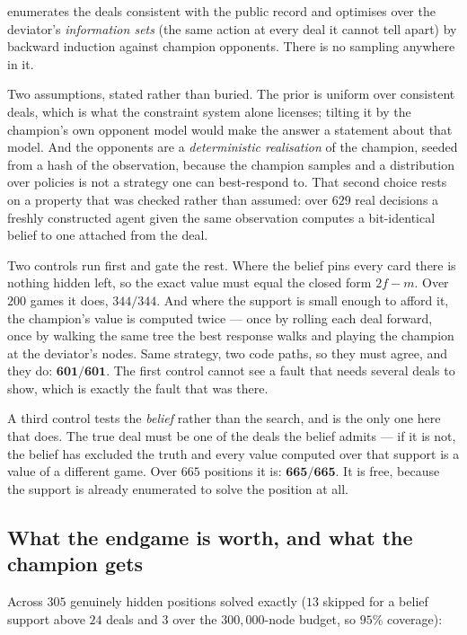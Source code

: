 \documentclass[11pt,letterpaper]{article}
\begin{document}
 enumerates the deals consistent with the public record
and optimises over the deviator's \emph{information sets} (the same action
at every deal it cannot tell apart) by backward induction against champion
opponents. There is no sampling anywhere in it.

Two assumptions, stated rather than buried. The prior is uniform over
consistent deals, which is what the constraint system alone licenses; tilting
it by the champion's own opponent model would make the answer a statement about
that model. And the opponents are a \emph{deterministic realisation} of the
champion, seeded from a hash of the observation, because the champion samples
and a distribution over policies is not a strategy one can best-respond to.
That second choice rests on a property that was checked rather than assumed:
over $629$ real decisions a freshly constructed agent given the same
observation computes a bit-identical belief to one attached from the deal.

Two controls run first and gate the rest. Where the belief pins every card
there is nothing hidden left, so the exact value must equal the closed form
$2f - m$. Over $200$ games it does, \textbf{$344/344$}. And where the support
is small enough to afford it, the champion's value is computed twice --- once
by rolling each deal forward, once by walking the same tree the best response
walks and playing the champion at the deviator's nodes. Same strategy, two code
paths, so they must agree, and they do: $\mathbf{601/601}$. The first control
cannot see a fault that needs several deals to show, which is exactly the fault
that was there.

A third control tests the \emph{belief} rather than the search, and is the only
one here that does. The true deal must be one of the deals the belief admits ---
if it is not, the belief has excluded the truth and every value computed over
that support is a value of a different game. Over $665$ positions it is: $\mathbf{665/665}$. It is free, because the
support is already enumerated to solve the position at all.

\subsection{What the endgame is worth, and what the champion gets}

Across $305$ genuinely hidden positions solved exactly ($13$ skipped for a
belief support above $24$ deals and $3$ over the $300{,}000$-node budget, so
$95\%$ coverage):
\end{document}

